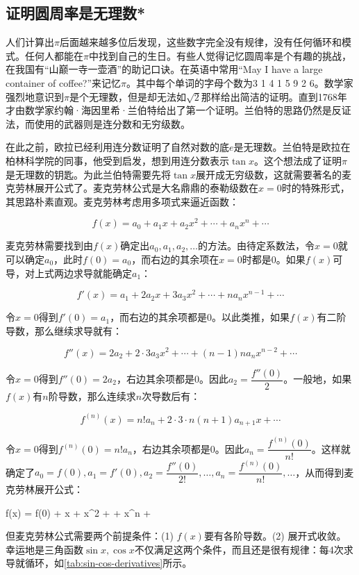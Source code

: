 \documentclass[b5paper]{ctexart}
\begin{document}
\subsection{证明圆周率是无理数*}
人们计算出$\pi$后面越来越多位后发现，这些数字完全没有规律，没有任何循环和模式。任何人都能在$\pi$中找到自己的生日。有些人觉得记忆圆周率是个有趣的挑战，在我国有“山巅一寺一壶酒”的助记口诀。在英语中常用“May I have a large container of coffee?”来记忆$\pi$。其中每个单词的字母个数为3 1 4 1 5 9 2 6。数学家强烈地意识到$\pi$是个无理数，但是却无法如$\sqrt{2}$那样给出简洁的证明。直到1768年才由数学家约翰·海因里希·兰伯特给出了第一个证明。兰伯特的思路仍然是反证法，而使用的武器则是连分数和无穷级数。

在此之前，欧拉已经利用连分数证明了自然对数的底$e$是无理数。兰伯特是欧拉在柏林科学院的同事，他受到启发，想到用连分数表示$\tan x$。这个想法成了证明$\pi$是无理数的钥匙。为此兰伯特需要先将$\tan x$展开成无穷级数，这就需要著名的麦克劳林展开公式了。麦克劳林公式是大名鼎鼎的泰勒级数在$x = 0$时的特殊形式，其思路朴素直观。麦克劳林考虑用多项式来逼近函数：

\[
f(x) = a_0 + a_1 x + a_2 x^2 + \dotsb + a_n x^n + \dotsb
\]

麦克劳林需要找到由$f(x)$确定出$a_0, a_1, a_2, \dots$的方法。由待定系数法，令$x = 0$就可以确定$a_0$，此时$f(0) = a_0$，而右边的其余项在$x = 0$时都是0。如果$f(x)$可导，对上式两边求导就能确定$a_1$：

\[
f'(x) = a_1 + 2a_2 x + 3 a_3 x^2 + \dotsb + n a_n x^{n-1} + \dotsb
\]

令$x = 0$得到$f'(0) = a_1$，而右边的其余项都是0。以此类推，如果$f(x)$有二阶导数，那么继续求导就有：

\[
f''(x) = 2a_2 + 2 \cdot 3 a_3 x^2 + \dotsb + (n-1)n a_n x^{n-2} + \dotsb
\]

令$x = 0$得到$f''(0) = 2a_2$，右边其余项都是0。因此$a_2 = \dfrac{f''(0)}{2}$。一般地，如果$f(x)$有$n$阶导数，那么连续求$n$次导数后有：

\[
f^{(n)}(x) = n!a_n + 2 \cdot 3 \cdot n (n+1) a_{n+1} x + \dotsb
\]

令$x = 0$得到$f^{(n)}(0) = n!a_n$，右边其余项都是0。因此$a_n = \dfrac{f^{(n)}(0)}{n!}$。这样就确定了$a_0 = f(0), a_1 = f'(0), a_2 = \dfrac{f''(0)}{2!}, \dotsc, a_n = \dfrac{f^{(n)}(0)}{n!}, \dotsc$，从而得到麦克劳林展开公式：

\be \label{eq:maclaurin}
f(x) = f(0) + x + x^2 + \dotsb + x^n + \dotsb
\ee

但麦克劳林公式需要两个前提条件：(1) $f(x)$要有各阶导数。(2) 展开式收敛。幸运地是三角函数$\sin x, \cos x$不仅满足这两个条件，而且还是很有规律：每4次求导就循环，如\cref{tab:sin-cos-derivatives}所示。
\end{document}
